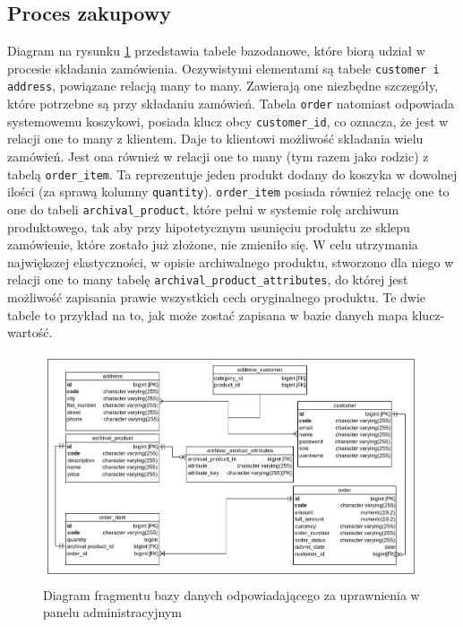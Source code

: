 \subsection{Proces zakupowy}
Diagram na rysunku \ref{db_zakup} przedstawia tabele bazodanowe, które biorą udział w procesie składania zamówienia. Oczywistymi elementami są tabele \texttt{customer i address}, powiązane relacją many to many. Zawierają one niezbędne szczegóły, które potrzebne są przy składaniu zamówień. Tabela \texttt{order} natomiast odpowiada systemowemu koszykowi, posiada klucz obcy \texttt{customer\_id}, co oznacza, że jest w relacji one to many z klientem. Daje to klientowi możliwość składania wielu zamówień. Jest ona również w relacji one to many (tym razem jako rodzic) z tabelą \texttt{order\_item}.  Ta reprezentuje jeden produkt dodany do koszyka w dowolnej ilości (za sprawą kolumny \texttt{quantity}). \texttt{order\_item} posiada również relację one to one do tabeli \texttt{archival\_product}, które pełni w systemie rolę archiwum produktowego, tak aby przy hipotetycznym usunięciu produktu ze sklepu zamówienie, które zostało już złożone, nie zmieniło się. W celu utrzymania największej elastyczności, w opisie archiwalnego produktu, stworzono dla niego w relacji one to many tabelę \texttt{archival\_product\_attributes}, do której jest możliwość zapisania prawie wszystkich cech oryginalnego produktu. Te dwie tabele to przykład na to, jak może zostać zapisana w bazie danych mapa klucz-wartość.  

\begin{figure}
	\begin{center}
		\includegraphics[scale=0.28]{db_zakup.png}
	\end{center}
	\caption{{\color{black}Diagram fragmentu bazy danych odpowiadającego za uprawnienia w panelu administracyjnym}} \label{db_zakup}
\end{figure}

